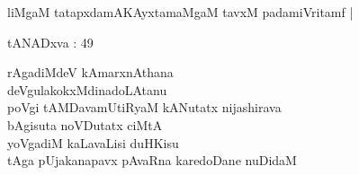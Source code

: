 \begin{entry}
\begin{shl}
\end{shl}
\end{entry}

\begin{entry}
\begin{shl}
liMgaM tatapxdamAKAyxtamaMgaM tavxM padamiVritamf |
\end{shl}
\end{entry}

\begin{entry}
\gl{}
\info{}{}{}{}
\begin{shl}
tANADxva : 49
\end{shl}
\end{entry}

\begin{entry}
\gl{}
\begin{shl}
rAgadiMdeV kAmarxnAthana\\
deVgulakokxMdinadoLAtanu\\
poVgi tAMDavamUtiRyaM kANutatx nijashirava\\
bAgisuta noVDutatx ciMtA\\
yoVgadiM kaLavaLisi duHKisu\\
tAga pUjakanapavx pAvaRna karedoDane nuDidaM
\end{shl}
\end{entry}

